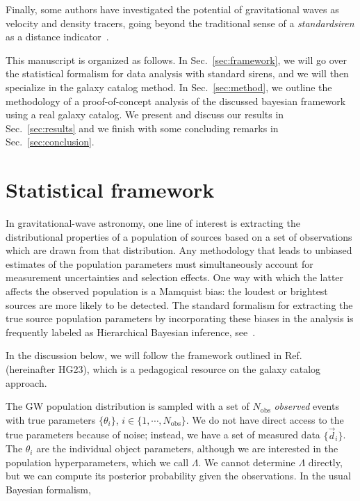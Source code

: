 \documentclass[%
preprint,
nofootinbib,
 amsmath,amssymb,
 aps,
]{revtex4-2}
\newcommand{\nobs}[0]{N_{\text{obs}}}
\begin{document}
Finally, some authors have investigated the potential of gravitational waves as velocity and
density tracers, going beyond the traditional sense of a \textit{standardsiren} as a distance
indicator~\cite{Palmese_2021,Alfradique:2022tox}.

This manuscript is organized as follows. In Sec.~\ref{sec:framework}, we will go over the
statistical formalism for data analysis with standard sirens, and we will then specialize in the
galaxy catalog method. In Sec.~\ref{sec:method}, we outline the methodology of a proof-of-concept
analysis of the discussed bayesian framework using a real galaxy catalog. We present and discuss
our results in Sec.~\ref{sec:results} and we finish with some concluding remarks in
Sec.~\ref{sec:conclusion}.

\section{\label{sec:framework}Statistical framework}

In gravitational-wave astronomy, one line of interest is extracting the distributional properties
of a population of sources based on a set of observations which are drawn from that distribution.
Any methodology that leads to unbiased estimates of the population parameters must simultaneously
account for measurement uncertainties and selection effects. One way with which the latter affects
the observed population is a Mamquist bias: the loudest or brightest sources are more likely to be
detected. The standard formalism for extracting the true source population parameters by
incorporating these biases in the analysis is frequently labeled as Hierarchical Bayesian
inference, see~\cite{Loredo:2004nn,Mandel:2018mve,Vitale_2021}.

In the discussion below, we will follow the framework outlined in Ref.~
(hereinafter HG23), which is a pedagogical resource on the galaxy catalog approach.

The GW population distribution is sampled with a set of $\nobs$ \textit{observed} events with true
parameters $\{ \theta_i \}$, $i \in \{1, \cdots, \nobs\}$. We do not have direct access to the true
parameters because of noise; instead, we have a set of measured data $\{ \vec{d}_i \}$. The
$\theta_i$ are the individual object parameters, although we are interested in the population
hyperparameters, which we call $\Lambda$. We cannot determine $\Lambda$ directly, but we can
compute its posterior probability given the observations. In the usual Bayesian formalism,
\end{document}
